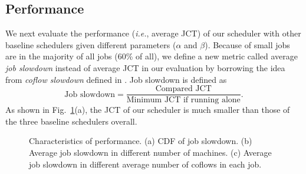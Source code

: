 \documentclass[10pt,journal,compsoc]{IEEEtran}
\begin{document}
\subsection{Performance}
We next evaluate the performance (\emph{i.e.}, average JCT) of our scheduler with other baseline schedulers given different parameters ($\alpha$ and $\beta$).
%
Because of small jobs are in the majority of all jobs (60\% of all),
we define a new metric called average \emph{job slowdown} instead of average JCT in our evaluation by borrowing the idea from \emph{coflow slowdown} defined in \cite{utopia}.
%
Job slowdown is defined as
\[\text{Job slowdown} = \frac{\text{Compared JCT}}{\text{Minimum JCT if running alone}}.\]
%
As shown in Fig.~\ref{f2}(a), the JCT of our scheduler is much smaller than those of the three baseline schedulers overall.

\begin{figure}[!t]
	\centering
	\hfil
	\hfil
	\caption{Characteristics of performance. (a) CDF of job slowdown. (b) Average job slowdown in different number of machines. (c) Average job slowdown in different average number of coflows in each job.}
	\label{f2}
\end{figure}
\end{document}
